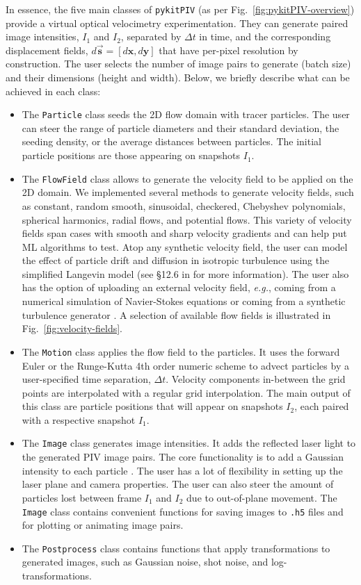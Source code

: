 \documentclass[a4paper,fleqn]{cas-dc}
\begin{document}
In essence, the five main classes of \texttt{pykitPIV} (as per Fig.~\ref{fig:pykitPIV-overview}) provide a virtual optical velocimetry experimentation. They can generate paired image intensities, $I_1$ and $I_2$, separated by $\Delta t$ in time, and the corresponding displacement fields, $d\vec{\mathbf{s}} = [d \mathbf{x}, d\mathbf{y}]$ that have per-pixel resolution by construction. The user selects the number of image pairs to generate (batch size) and their dimensions (height and width). Below, we briefly describe what can be achieved in each class:
\begin{itemize}
\item The \texttt{Particle} class seeds the 2D flow domain with tracer particles. The user can steer the range of particle diameters and their standard deviation, the seeding density, or the average distances between particles. The initial particle positions are those appearing on snapshots $I_1$.
\item The \texttt{FlowField} class allows to generate the velocity field to be applied on the 2D domain. We implemented several methods to generate velocity fields, such as constant, random smooth, sinusoidal, checkered, Chebyshev polynomials, spherical harmonics, radial flows, and potential flows. This variety of velocity fields span cases with smooth and sharp velocity gradients and can help put ML algorithms to test. Atop any synthetic velocity field, the user can model the effect of particle drift and diffusion in isotropic turbulence using the simplified Langevin model (see \S12.6 in \cite{pope2001turbulent} for more information). The user also has the option of uploading an external velocity field, \textit{e.g.}, coming from a numerical simulation of Navier-Stokes equations or coming from a synthetic turbulence generator \citep{saad2017scalable, richards2018fast}. A selection of available flow fields is illustrated in Fig.~\ref{fig:velocity-fields}.
\item The \texttt{Motion} class applies the flow field to the particles. It uses the forward Euler or the Runge-Kutta 4th order numeric scheme to advect particles by a user-specified time separation, $\Delta t$. Velocity components in-between the grid points are interpolated with a regular grid interpolation. The main output of this class are particle positions that will appear on snapshots $I_2$, each paired with a respective snapshot $I_1$.
\item The \texttt{Image} class generates image intensities. It adds the reflected laser light to the generated PIV image pairs. The core functionality is to add a Gaussian intensity to each particle \citep{olsen2000out, rabault2017performing}. The user has a lot of flexibility in setting up the laser plane and camera properties. The user can also steer the amount of particles lost between frame $I_1$ and $I_2$ due to out-of-plane movement. The \texttt{Image} class contains convenient functions for saving images to \texttt{.h5} files and for plotting or animating image pairs.
\item The \texttt{Postprocess} class contains functions that apply transformations to generated images, such as Gaussian noise, shot noise, and log-transformations.
\end{itemize}
\end{document}
